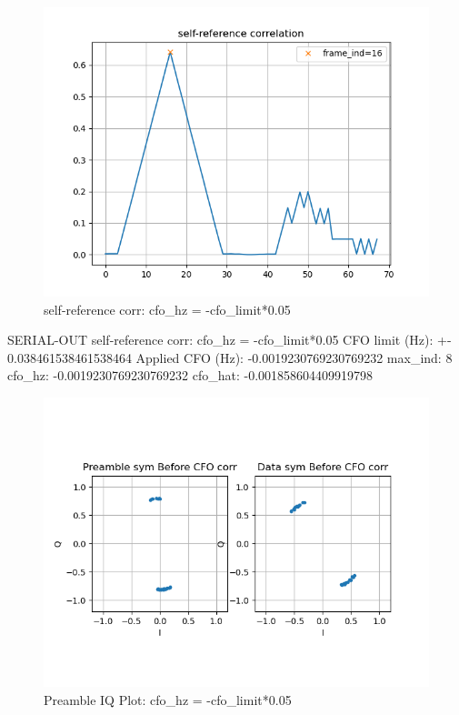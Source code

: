 \documentclass[
	letterpaper, %
	10pt, %
]{CSUniSchoolLabReport}
\begin{document}
\begin{figure}[H] %
	\centering %
	\includegraphics[width=1.2\textwidth]{assignment1d.png} %
	\caption{self-reference corr: cfo\_hz = -cfo\_limit*0.05}
	\label{fig:block}
\end{figure}
SERIAL-OUT self-reference corr: cfo\_hz = -cfo\_limit*0.05\newline
CFO limit (Hz): +-  0.038461538461538464\newline
Applied CFO (Hz):  -0.0019230769230769232\newline
max\_ind:  8\newline
cfo\_hz:  -0.0019230769230769232\newline
cfo\_hat:  -0.001858604409919798\newline

\begin{figure}[H] %
	\centering %
	\includegraphics[width=1.2\textwidth]{assignment1e.png} %
	\caption{Preamble IQ Plot: cfo\_hz = -cfo\_limit*0.05}
	\label{fig:block}
\end{figure}
\end{document}
